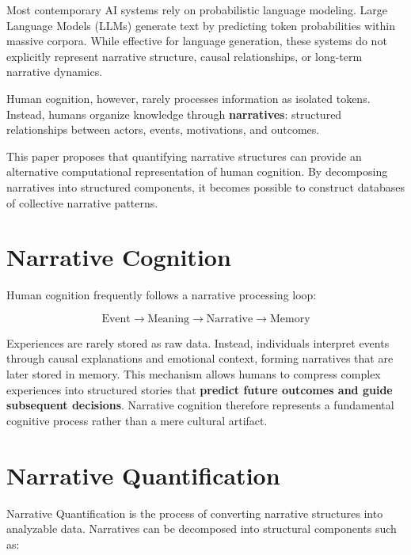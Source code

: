 \documentclass[11pt,a4paper]{article}
\begin{document}
Most contemporary AI systems rely on probabilistic language modeling.
Large Language Models (LLMs) generate text by predicting token
probabilities within massive corpora. While effective for language
generation, these systems do not explicitly represent narrative
structure, causal relationships, or long-term narrative dynamics.

Human cognition, however, rarely processes information as isolated
tokens. Instead, humans organize knowledge through \textbf{narratives}:
structured relationships between actors, events, motivations, and
outcomes.

This paper proposes that quantifying narrative structures can provide an
alternative computational representation of human cognition. By
decomposing narratives into structured components, it becomes possible
to construct databases of collective narrative patterns.

\section{Narrative Cognition}

Human cognition frequently follows a narrative processing loop:

\begin{equation}
\text{Event} \rightarrow \text{Meaning} \rightarrow \text{Narrative} \rightarrow \text{Memory}
\end{equation}

Experiences are rarely stored as raw data. Instead, individuals
interpret events through causal explanations and emotional context,
forming narratives that are later stored in memory. This mechanism
allows humans to compress complex experiences into structured stories
that \textbf{predict future outcomes and guide subsequent decisions}.
Narrative cognition therefore represents a fundamental cognitive process
rather than a mere cultural artifact.

\section{Narrative Quantification}

Narrative Quantification is the process of converting narrative
structures into analyzable data. Narratives can be decomposed into
structural components such as:
\end{document}
